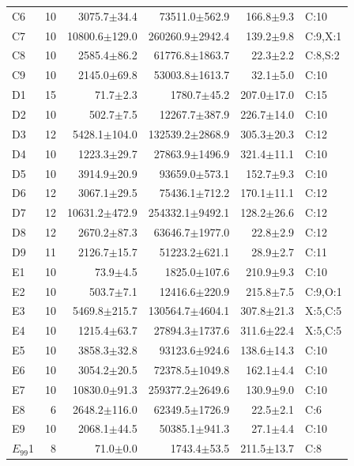 \begin{supertabular}{@{}lrrrrl@{}}
C6 & 10 & 3075.7$\pm$34.4 & 73511.0$\pm$562.9 & 166.8$\pm$9.3 & C:10 \\
C7 & 10 & 10800.6$\pm$129.0 & 260260.9$\pm$2942.4 & 139.2$\pm$9.8 & C:9,X:1 \\
C8 & 10 & 2585.4$\pm$86.2 & 61776.8$\pm$1863.7 & 22.3$\pm$2.2 & C:8,S:2 \\
C9 & 10 & 2145.0$\pm$69.8 & 53003.8$\pm$1613.7 & 32.1$\pm$5.0 & C:10 \\
D1 & 15 & 71.7$\pm$2.3 & 1780.7$\pm$45.2 & 207.0$\pm$17.0 & C:15 \\
D2 & 10 & 502.7$\pm$7.5 & 12267.7$\pm$387.9 & 226.7$\pm$14.0 & C:10 \\
D3 & 12 & 5428.1$\pm$104.0 & 132539.2$\pm$2868.9 & 305.3$\pm$20.3 & C:12 \\
D4 & 10 & 1223.3$\pm$29.7 & 27863.9$\pm$1496.9 & 321.4$\pm$11.1 & C:10 \\
D5 & 10 & 3914.9$\pm$20.9 & 93659.0$\pm$573.1 & 152.7$\pm$9.3 & C:10 \\
D6 & 12 & 3067.1$\pm$29.5 & 75436.1$\pm$712.2 & 170.1$\pm$11.1 & C:12 \\
D7 & 12 & 10631.2$\pm$472.9 & 254332.1$\pm$9492.1 & 128.2$\pm$26.6 & C:12 \\
D8 & 12 & 2670.2$\pm$87.3 & 63646.7$\pm$1977.0 & 22.8$\pm$2.9 & C:12 \\
D9 & 11 & 2126.7$\pm$15.7 & 51223.2$\pm$621.1 & 28.9$\pm$2.7 & C:11 \\
E1 & 10 & 73.9$\pm$4.5 & 1825.0$\pm$107.6 & 210.9$\pm$9.3 & C:10 \\
E2 & 10 & 503.7$\pm$7.1 & 12416.6$\pm$220.9 & 215.8$\pm$7.5 & C:9,O:1 \\
E3 & 10 & 5469.8$\pm$215.7 & 130564.7$\pm$4604.1 & 307.8$\pm$21.3 & X:5,C:5 \\
E4 & 10 & 1215.4$\pm$63.7 & 27894.3$\pm$1737.6 & 311.6$\pm$22.4 & X:5,C:5 \\
E5 & 10 & 3858.3$\pm$32.8 & 93123.6$\pm$924.6 & 138.6$\pm$14.3 & C:10 \\
E6 & 10 & 3054.2$\pm$20.5 & 72378.5$\pm$1049.8 & 162.1$\pm$4.4 & C:10 \\
E7 & 10 & 10830.0$\pm$91.3 & 259377.2$\pm$2649.6 & 130.9$\pm$9.0 & C:10 \\
E8 & 6 & 2648.2$\pm$116.0 & 62349.5$\pm$1726.9 & 22.5$\pm$2.1 & C:6 \\
E9 & 10 & 2068.1$\pm$44.5 & 50385.1$\pm$941.3 & 27.1$\pm$4.4 & C:10 \\
$E_{99}$1 & 8 & 71.0$\pm$0.0 & 1743.4$\pm$53.5 & 211.5$\pm$13.7 & C:8 \\

\end{supertabular}
